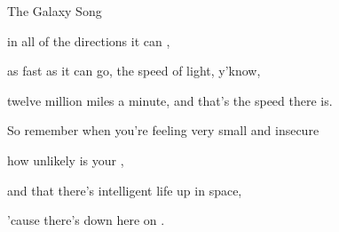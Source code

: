 \begin{SBSong}{The Galaxy Song}
\begin{SBVerse}
    in all of the directions it can , 
    
    as fast as it can go, the speed of light, y'know, 
    
    twelve million miles a minute, and that's the  speed there is.
    
    So remember when you're feeling very small and insecure 
    
    how  unlikely is your , 
    
    and  that there's intelligent life  up in space, 
    
    'cause there's  down here on .
  \end{SBVerse}
\end{SBSong}
